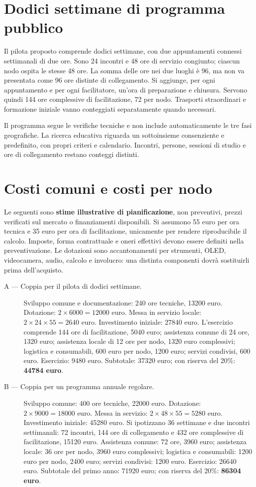 \section{Dodici settimane di programma pubblico}
Il pilota proposto comprende dodici settimane, con due appuntamenti
connessi settimanali di due ore. Sono 24 incontri e 48 ore di servizio
congiunto; ciascun nodo ospita le stesse 48 ore. La somma delle ore nei
due luoghi è 96, ma non va presentata come 96 ore distinte di collegamento.
Si aggiunge, per ogni appuntamento e per ogni facilitatore, un'ora di
preparazione e chiusura. Servono quindi 144 ore complessive di facilitazione,
72 per nodo. Trasporti straordinari e formazione iniziale vanno conteggiati
separatamente quando necessari.

Il programma segue le verifiche tecniche e non include automaticamente
le tre fasi geografiche. La ricerca educativa riguarda un sottoinsieme
consenziente e predefinito, con propri criteri e calendario. Incontri,
persone, sessioni di studio e ore di collegamento restano conteggi distinti.

\section{Costi comuni e costi per nodo}
Le seguenti sono \textbf{stime illustrative di pianificazione}, non
preventivi, prezzi verificati sul mercato o finanziamenti disponibili.
Si assumono 55 euro per ora tecnica e 35 euro per ora di facilitazione,
unicamente per rendere riproducibile il calcolo. Imposte, forma contrattuale
e oneri effettivi devono essere definiti nella preventivazione. Le dotazioni
sono accantonamenti per strumenti, OLED, videocamera, audio, calcolo e
involucro: una distinta componenti dovrà sostituirli prima dell'acquisto.

\begin{description}
\item[A --- Coppia per il pilota di dodici settimane.]
Sviluppo comune e documentazione: 240 ore tecniche, 13200 euro.
Dotazione: $2\times6000=12000$ euro. Messa in servizio locale:
$2\times24\times55=2640$ euro. Investimento iniziale: 27840 euro.
L'esercizio comprende 144 ore di facilitazione, 5040 euro;
assistenza comune di 24 ore, 1320 euro; assistenza locale di 12 ore
per nodo, 1320 euro complessivi; logistica e consumabili, 600 euro
per nodo, 1200 euro; servizi condivisi, 600 euro.
Esercizio: 9480 euro. Subtotale: 37320 euro; con riserva del 20\%:
\textbf{44784 euro}.
\item[B --- Coppia per un programma annuale regolare.]
Sviluppo comune: 400 ore tecniche, 22000 euro. Dotazione:
$2\times9000=18000$ euro. Messa in servizio:
$2\times48\times55=5280$ euro. Investimento iniziale: 45280 euro.
Si ipotizzano 36 settimane e due incontri settimanali: 72 incontri,
144 ore di collegamento e 432 ore complessive di facilitazione,
15120 euro. Assistenza comune: 72 ore, 3960 euro; assistenza locale:
36 ore per nodo, 3960 euro complessivi; logistica e consumabili:
1200 euro per nodo, 2400 euro; servizi condivisi: 1200 euro.
Esercizio: 26640 euro. Subtotale del primo anno: 71920 euro;
con riserva del 20\%: \textbf{86304 euro}.
\end{description}

